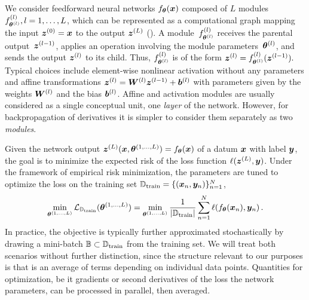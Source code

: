 We consider feedforward neural networks $f_{{\bm{\theta}}}({\bm{x}})$ composed of $L$ modules
$f^{(l)}_{{\bm{\theta}}^{(l)}}, l = 1, \ldots, L$, which can be represented as a
computational graph mapping the input ${\bm{z}}^{(0)}={\bm{x}}$ to the output ${\bm{z}}^{(L)}$
(). A module~$f^{(l)}_{{\bm{\theta}}^{(l)}}$ receives the parental
output~${\bm{z}}^{(l-1)}$, applies an operation involving the module
parameters~${\bm{\theta}}^{(l)}$, and sends the output ${\bm{z}}^{(l)}$ to its child. Thus,
$f^{(l)}_{{\bm{\theta}}^{(l)}}$ is of the form
\begin{math}
  \vz^{(l)} = f^{(l)}_{\vtheta^{(l)}}(\vz^{(l-1)}). %
\end{math}
Typical choices include element-wise nonlinear activation without any parameters
and affine transformations ${\bm{z}}^{(l)} = {\bm{W}}^{(l)} {\bm{z}}^{(l-1)} + {\bm{b}}^{(l)}$ with
parameters given by the weights ${\bm{W}}^{(l)}$ and the bias ${\bm{b}}^{(l)} $. Affine and
activation modules are usually considered as a single conceptual unit, one
\emph{layer} of the network. However, for backpropagation of derivatives it is
simpler to consider them separately as two \emph{modules}.

Given the network output ${\bm{z}}^{(L)}({\bm{x}}, {\bm{\theta}}^{(1, \dots, L)}) = f_{{\bm{\theta}}}({\bm{x}})$ of a datum
${\bm{x}}$ with label ${\bm{y}}$, the goal is to minimize the expected risk of the loss
function $\ell({\bm{z}}^{(L)}, {\bm{y}})$. Under the framework of empirical risk minimization,
the parameters are tuned to optimize the loss on the training set ${\mathbb{D}}_{\text{train}}=
\{({\bm{x}}_{n},{\bm{y}}_{n})\}_{n=1}^N$,
\begin{align}
  \label{hbp::equ:objective}
  \min_{{\bm{\theta}}^{(1,\dots, L)}} {\mathcal{L}}_{{\mathbb{D}}_{\text{train}}}({\bm{\theta}}^{(1,\dots, L)})
  =
  \min_{{\bm{\theta}}^{(1,\dots, L)}} \frac{1}{|{\mathbb{D}}_{\text{train}}|}
  \sum_{n=1}^{N}
  \ell(f_{{\bm{\theta}}}({\bm{x}}_{n}), {\bm{y}}_{n})\,.
\end{align}
In practice, the objective is typically further approximated stochastically by
drawing a mini-batch ${\mathbb{B}} \subset {\mathbb{D}}_{\text{train}}$ from the training set. We
will treat both scenarios without further distinction, since the structure
relevant to our purposes is that  is an average of
terms depending on individual data points. Quantities for optimization, be it
gradients or second derivatives of the loss \wrt the network parameters, can be
processed in parallel, then averaged.

